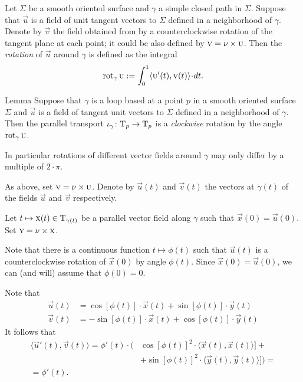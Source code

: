 Let $\Sigma$ be a smooth oriented surface and $\gamma$ a simple closed path in $\Sigma$.
Suppose that $\vec u$ is a field of unit tangent vectors to $\Sigma$ defined in a neighborhood of $\gamma$.
Denote by $\vec v$ the field obtained from by a counterclockwise rotation of the tangent plane at each point; it could be also defined by $\textsc v=\nu\times\textsc u$.
Then the \emph{rotation} of $\vec u$ around $\gamma$ is defined as the integral
\[\rot_\gamma\vec u
\df
\int_0^1\langle\vec u'(t),\vec v(t)\rangle\cdot dt.\]

\begin{thm}{Lemma}\label{lem:rotation-parallel}
Suppose that $\gamma$ is a loop based at a point $p$ in a smooth oriented surface $\Sigma$ and $\vec u$ is a field of tangent unit vectors to $\Sigma$ defined in a neighborhood of $\gamma$.
Then the parallel transport $\iota_\gamma\colon\mathrm{T}_p\to\mathrm{T}_p$ is a {}\emph{clockwise} rotation by the angle $\mathop{\rm rot}\nolimits_\gamma\textsc u$.

In particular rotations of different vector fields around $\gamma$ may only differ by a multiple of $2\cdot\pi$.
\end{thm}

As above, set $\textsc v=\nu\times\textsc u$. 
Denote by $\vec u(t)$ and $\vec v(t)$ the vectors at $\gamma(t)$ of the fields $\vec u$ and $\vec v$ respectively.

Let $t\mapsto \textsc x(t)\in \mathrm{T}_{\gamma(t)}$ be a parallel vector field along $\gamma$ such that $\vec x(0)=\vec u(0)$.
Set $\textsc y=\nu\times\textsc x$.

Note that there is a continuous function $t\mapsto \phi(t)$ such that 
$\vec u(t)$ is a counterclockwise rotation of $\vec x(0)$ by angle $\phi(t)$.
Since $\vec x(0)=\vec u(0)$, we can (and will) assume that $\phi(0)=0$.

Note that
\begin{align*}
\vec u(t)&=\cos[\phi(t)]\cdot \vec x(t)+\sin[\phi(t)]\cdot \vec y(t)
\\
\vec v(t)&=-\sin[\phi(t)]\cdot \vec x(t)+\cos[\phi(t)]\cdot \vec y(t)
\end{align*}
It follows that 
\begin{align*}
\langle\vec u'(t),\vec v(t)\rangle
=\phi'(t)\cdot\biggl(&\cos[\phi(t)]^2\cdot \langle\vec x(t),\vec x(t)\rangle]+
\\
&+\sin[\phi(t)]^2\cdot \langle\vec y(t),\vec y(t)\rangle]\biggr)=
\\
=\phi'(t).\ &
\end{align*}

